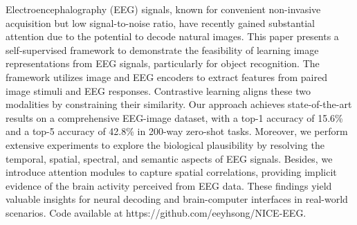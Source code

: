 Electroencephalography (EEG) signals, known for convenient non-invasive acquisition but low signal-to-noise ratio, have recently gained substantial attention due to the potential to decode natural images. 
This paper presents a self-supervised framework to demonstrate the feasibility of learning image representations from EEG signals, particularly for object recognition. 
The framework utilizes image and EEG encoders to extract features from paired image stimuli and EEG responses. 
Contrastive learning aligns these two modalities by constraining their similarity.
Our approach achieves state-of-the-art results on a comprehensive EEG-image dataset, with a top-1 accuracy of 15.6\% and a top-5 accuracy of 42.8\% in 200-way zero-shot tasks.
Moreover, we perform extensive experiments to explore the biological plausibility by resolving the temporal, spatial, spectral, and semantic aspects of EEG signals. 
Besides, we introduce attention modules to capture spatial correlations, providing implicit evidence of the brain activity perceived from EEG data.
These findings yield valuable insights for neural decoding and brain-computer interfaces in real-world scenarios.
Code available at https://github.com/eeyhsong/NICE-EEG.

